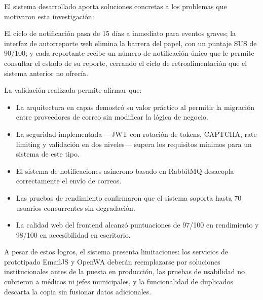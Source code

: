 

\begin{conclusions}

El sistema desarrollado aporta soluciones concretas a los problemas que motivaron esta investigación:

El ciclo de notificación pasa de 15 días a inmediato para eventos graves; la interfaz de autorreporte web elimina la barrera del papel, con un puntaje SUS de 90/100; y cada reportante recibe un número de notificación único que le permite consultar el estado de su reporte, cerrando el ciclo de retroalimentación que el sistema anterior no ofrecía.


La validación realizada permite afirmar que:

\begin{itemize}
    \item La arquitectura en capas demostró su valor práctico al permitir la migración entre proveedores de correo sin modificar la lógica de negocio.
    \item La seguridad implementada —JWT con rotación de tokens, CAPTCHA, rate limiting y validación en dos niveles— supera los requisitos mínimos para un sistema de este tipo.
    \item El sistema de notificaciones asíncrono basado en RabbitMQ desacopla correctamente el envío de correos.
    \item Las pruebas de rendimiento confirmaron que el sistema soporta hasta 70 usuarios concurrentes sin degradación.
    \item La calidad web del frontend alcanzó puntuaciones de 97/100 en rendimiento y 98/100 en accesibilidad en escritorio.
\end{itemize}

A pesar de estos logros, el sistema presenta limitaciones: los servicios de prototipado EmailJS y OpenWA deberán reemplazarse por soluciones institucionales antes de la puesta en producción, las pruebas de usabilidad no cubrieron a médicos ni jefes municipales, y la funcionalidad de duplicados descarta la copia sin fusionar datos adicionales.

\end{conclusions}